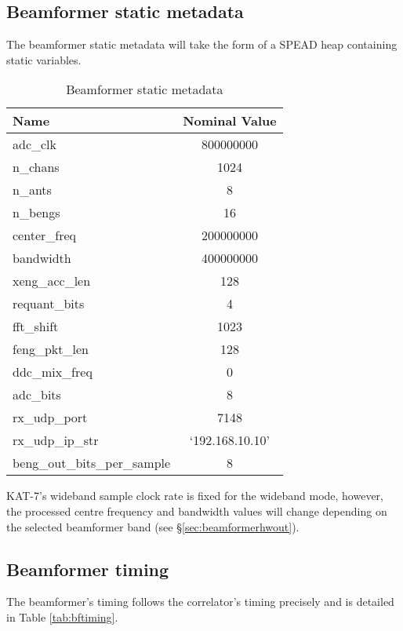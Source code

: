 \documentclass[11pt,english,twoside]{article}
\begin{document}
\subsection{Beamformer static metadata}
The beamformer static metadata will take the form of a SPEAD heap containing static variables.

\begin{table}[htbp]
\caption{Beamformer static metadata}
\begin{center}
\begin{tabular}{|l|c|} \hline
{\bf Name} & {\bf Nominal Value} \\ \hline
adc\_clk         & 800000000\\ \hline
n\_chans         & 1024 \\ \hline
n\_ants          & 8 \\ \hline
n\_bengs         & 16 \\ \hline
center\_freq     & 200000000 \\ \hline
bandwidth        & 400000000 \\ \hline
xeng\_acc\_len   & 128 \\ \hline
requant\_bits    & 4 \\ \hline
fft\_shift       & 1023 \\ \hline
feng\_pkt\_len   & 128 \\ \hline
ddc\_mix\_freq   & 0 \\ \hline
adc\_bits        & 8 \\ \hline
rx\_udp\_port    & 7148 \\ \hline
rx\_udp\_ip\_str & `192.168.10.10' \\ \hline
beng\_out\_bits\_per\_sample & 8 \\ \hline
\end{tabular}
\end{center}
\label{tab:beamformerstatic}
\end{table}%

KAT-7's wideband sample clock rate is fixed for the wideband mode, however, the processed centre frequency and bandwidth values will change
depending on the selected beamformer band (see \S\ref{sec:beamformerhwout}).

\subsection{Beamformer timing}
The beamformer's timing follows the correlator's timing precisely and is detailed in Table \ref{tab:bftiming}.
\end{document}
